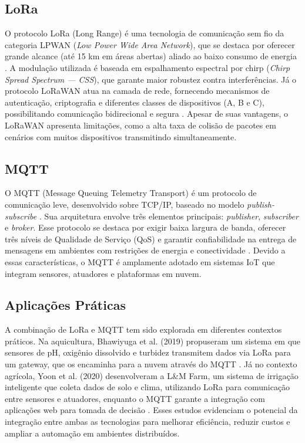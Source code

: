 \documentclass[
article,			%
11pt,				%
twoside,			%
a4paper,			%
section=TITLE,		%
onecolumn,          %
english,			%
brazil,				%
sumario=tradicional
]{abntex2}
\begin{document}
    \subsection{LoRa}
    O protocolo LoRa (Long Range) é uma tecnologia de comunicação sem fio da categoria LPWAN (\textit{Low Power Wide Area Network}), que se destaca por oferecer grande alcance (até 15 km em áreas abertas) aliado ao baixo consumo de energia \cite{lima2023}. A modulação utilizada é baseada em espalhamento espectral por chirp (\textit{Chirp Spread Spectrum — CSS}), que garante maior robustez contra interferências. Já o protocolo LoRaWAN atua na camada de rede, fornecendo mecanismos de autenticação, criptografia e diferentes classes de dispositivos (A, B e C), possibilitando comunicação bidirecional e segura \cite{huh2019}. Apesar de suas vantagens, o LoRaWAN apresenta limitações, como a alta taxa de colisão de pacotes em cenários com muitos dispositivos transmitindo simultaneamente.

    \subsection{MQTT}
    O MQTT (Message Queuing Telemetry Transport) é um protocolo de comunicação leve, desenvolvido sobre TCP/IP, baseado no modelo \textit{publish-subscribe} \cite{Yoon2020}. Sua arquitetura envolve três elementos principais: \textit{publisher}, \textit{subscriber} e \textit{broker}. Esse protocolo se destaca por exigir baixa largura de banda, oferecer três níveis de Qualidade de Serviço (QoS) e garantir confiabilidade na entrega de mensagens em ambientes com restrições de energia e conectividade \cite{Bhawiyuga2019}. Devido a essas características, o MQTT é amplamente adotado em sistemas IoT que integram sensores, atuadores e plataformas em nuvem.

    \subsection{Aplicações Práticas}
    A combinação de LoRa e MQTT tem sido explorada em diferentes contextos práticos. Na aquicultura, Bhawiyuga et al. (2019) propuseram um sistema em que sensores de pH, oxigênio dissolvido e turbidez transmitem dados via LoRa para um gateway, que os encaminha para a nuvem através do MQTT \cite{Bhawiyuga2019}. Já no contexto agrícola, Yoon et al. (2020) desenvolveram a L\&M Farm, um sistema de irrigação inteligente que coleta dados de solo e clima, utilizando LoRa para comunicação entre sensores e atuadores, enquanto o MQTT garante a integração com aplicações web para tomada de decisão \cite{Yoon2020}. Esses estudos evidenciam o potencial da integração entre ambas as tecnologias para melhorar eficiência, reduzir custos e ampliar a automação em ambientes distribuídos.
\end{document}
